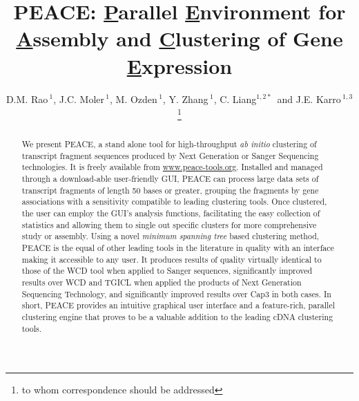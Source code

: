 \documentclass[a4,center,fleqn]{NAR}
\newcommand{\mc}[1]{#1}
\newcommand{\peace} {{\small PEACE}}
\newcommand{\wcd} {{\small WCD}}
\newcommand{\capthree} {{\small Cap3}}
\newcommand{\tgicl} {{\small TGICL}}
\begin{document}
\title{PEACE: {\underline P}arallel {\underline E}nvironment for {\underline A}ssembly
  and {\underline C}lustering of Gene {\underline E}xpression}

\author{D.M. Rao\,$^{1}$, J.C. Moler\,$^{1}$, M. Ozden\,$^1$, Y. Zhang\,$^{1}$,
  C. Liang$^{1,2*}$\, and J.E. Karro\,$^{1,3}$\footnote{to whom
    correspondence should be addressed}}

\address{$^1$ Department of Computer Science and Software Engineering, \\
  $^2$ Department of Botany, \\
  $^3$ and Department of Microbiology, Miami University, Oxford, Ohio,
  USA}




\maketitle

\begin{abstract}
  \mc{We present \peace, a stand alone tool for high-throughput {\it
      ab initio} clustering of transcript fragment sequences produced
    by Next Generation or Sanger Sequencing technologies.  It is
    freely available from
    \href{http://www.peace-tools.org}{www.peace-tools.org}.  Installed
    and managed through a download-able user-friendly GUI, \peace\/
    can process large data sets of transcript fragments of length 50
    bases or greater, grouping the fragments by gene associations with
    a sensitivity compatible to leading clustering tools.  Once
    clustered, the user can employ the GUI's analysis functions,
    facilitating the easy collection of statistics and allowing them
    to single out specific clusters for more comprehensive study or
    assembly.  Using a novel {\it minimum spanning tree} based
    clustering method, \peace\/ is the equal of other leading tools in
    the literature in quality with an interface making it
    accessible to any user.  It produces results of quality virtually
    identical to those of the \wcd\/ tool when applied to Sanger
    sequences, significantly improved results over \wcd\/ and \tgicl\/ when applied
    the products of Next Generation Sequencing Technology, and
    significantly improved results over \capthree\/ in both cases.  In
    short, \peace\/ provides an intuitive graphical user interface and
    a feature-rich, parallel clustering engine that proves to be a
    valuable addition to the leading cDNA clustering tools.}

\end{abstract}
\end{document}
